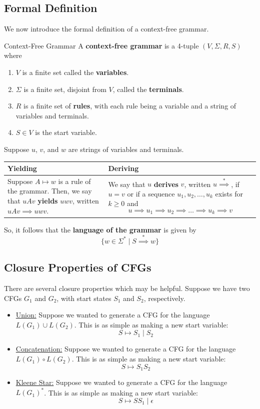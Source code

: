\documentclass[letterpaper]{article}
\begin{document}
\subsection{Formal Definition}
We now introduce the formal definition of a context-free grammar. 
\begin{definition}{Context-Free Grammar}{}
    A \textbf{context-free grammar} is a 4-tuple $(V, \Sigma, R, S)$ where 
    \begin{enumerate}
        \item $V$ is a finite set called the \textbf{variables}.
        \item $\Sigma$ is a finite set, disjoint from $V$, called the \textbf{terminals}.
        \item $R$ is a finite set of \textbf{rules}, with each rule being a variable and a string of variables and terminals.
        \item $S \in V$ is the start variable. 
    \end{enumerate}
\end{definition}
Suppose $u$, $v$, and $w$ are strings of variables and terminals.
\begin{center}
    \begin{tabular}{p{3in}|p{3in}}
        \textbf{Yielding} & \textbf{Deriving} \\ 
        \hline 
        Suppose $A \mapsto w$ is a rule of the grammar. Then, we say that $uAv$ \textbf{yields} $uwv$, written $uAv \implies uwv$. &
        We say that $u$ \textbf{derives} $v$, written $u \stackrel{*}{\implies}$, if $u = v$ or if a sequence $u_1, u_2, \dots, u_k$ exists for $k \geq 0$ and 
        \[u \implies u_1 \implies u_2 \implies \dots \implies u_k \implies v\]
    \end{tabular}
\end{center}
So, it follows that the \textbf{language of the grammar} is given by 
\[\{w \in \Sigma^* \mid S \stackrel{*}{\implies} w\}\]

\subsection{Closure Properties of CFGs}
There are several closure properties which may be helpful. Suppose we have two CFGs $G_1$ and $G_2$, with start states $S_1$ and $S_2$, respectively. 
\begin{itemize}
    \item \underline{Union:} Suppose we wanted to generate a CFG for the language $L(G_1) \cup L(G_2)$. This is as simple as making a new start variable: 
    \[S \mapsto S_1 \mid S_2\]

    \item \underline{Concatenation:} Suppose we wanted to generate a CFG for the language $L(G_1) \circ L(G_2)$. This is as simple as making a new start variable:
    \[S \mapsto S_1 S_2\]

    \item \underline{Kleene Star:} Suppose we wanted to generate a CFG for the language $L(G_1)^*$. This is as simple as making a new start variable:
    \[S \mapsto S S_1 \mid \epsilon\]
\end{itemize}
\end{document}
